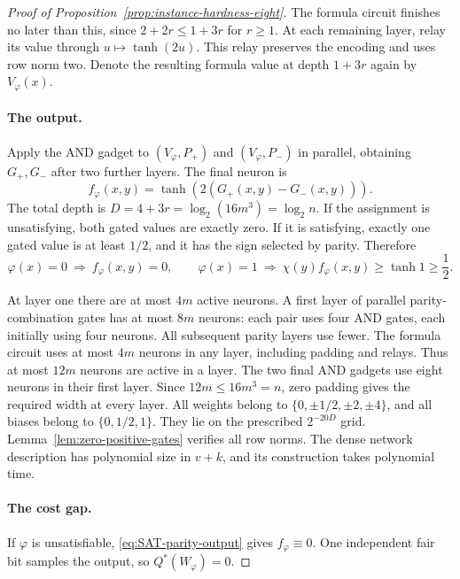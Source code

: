 \begin{proof}[Proof of Proposition~\ref{prop:instance-hardness-eight}]
The formula circuit finishes no later than this, since
\(2+2r\le1+3r\) for \(r\ge1\).  At each remaining layer,
relay its value through \(u\mapsto\tanh(2u)\).  This relay
preserves the encoding and uses row norm two.  Denote the resulting
formula value at depth \(1+3r\) again by \(V_\varphi(x)\).

\paragraph{The output.}
Apply the AND gadget to
\((V_\varphi,P_+)\) and \((V_\varphi,P_-)\) in parallel,
obtaining \(G_+,G_-\) after two further layers.  The final neuron
is
\[
 f_\varphi(x,y)=\tanh(2(G_+(x,y)-G_-(x,y))).
\]
The total depth is
\(D=4+3r=\log_2(16m^3)=\log_2n\).
If the assignment is unsatisfying, both gated values are exactly
zero.  If it is satisfying, exactly one gated value is at least
\(1/2\), and it has the sign selected by parity.  Therefore
\begin{equation}\label{eq:SAT-parity-output}
 \varphi(x)=0\ \Longrightarrow\ f_\varphi(x,y)=0,
 \qquad
 \varphi(x)=1\ \Longrightarrow\
 \chi(y)f_\varphi(x,y)\ge\tanh1\ge\frac12.
\end{equation}

At layer one there are at most \(4m\) active neurons.  A first
layer of parallel parity-combination gates has at most \(8m\)
neurons: each pair uses four AND gates, each initially using four
neurons.  All subsequent parity layers use fewer.  The formula
circuit uses at most \(4m\) neurons in any layer, including
padding and relays.  Thus at most \(12m\) neurons are active
in a layer.  The two final AND gadgets use eight neurons in their
first layer.  Since \(12m\le16m^3=n\), zero padding gives the
required width at every layer.  All weights belong to
\(\{0,\pm1/2,\pm2,\pm4\}\), and all biases belong to
\(\{0,1/2,1\}\).  They lie on the prescribed \(2^{-20D}\)
grid.  Lemma~\ref{lem:zero-positive-gates} verifies all row norms.
The dense network description has polynomial size in \(v+k\),
and its construction takes polynomial time.

\paragraph{The cost gap.}
If \(\varphi\) is unsatisfiable, \eqref{eq:SAT-parity-output}
gives \(f_\varphi\equiv0\).  One independent fair bit samples
the output, so \(Q^*(W_\varphi)=0\).


\end{proof}
